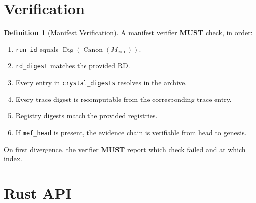 \documentclass[11pt,a4paper,twoside]{article}
\theoremstyle{definition}
\newtheorem{definition}{Definition}[section]
\theoremstyle{plain}
\theoremstyle{remark}
\DeclareMathOperator{\Canon}{Canon}
\DeclareMathOperator{\Dig}{Dig}
\begin{document}
\section{Verification}\label{sec:man:verify}

\begin{definition}[Manifest Verification]\label{def:manverify}
A manifest verifier \textbf{MUST} check, in order:
\begin{enumerate}[nosep,label=(MV\arabic*)]
  \item \texttt{run\_id} equals $\Dig(\Canon(M_{\mathrm{core}}))$.
  \item \texttt{rd\_digest} matches the provided RD.
  \item Every entry in \texttt{crystal\_digests} resolves in the archive.
  \item Every trace digest is recomputable from the corresponding trace
        entry.
  \item Registry digests match the provided registries.
  \item If \texttt{mef\_head} is present, the evidence chain is
        verifiable from head to genesis.
\end{enumerate}
On first divergence, the verifier \textbf{MUST} report which check
failed and at which index.
\end{definition}

\section{Rust API}\label{sec:man:api}
\end{document}
